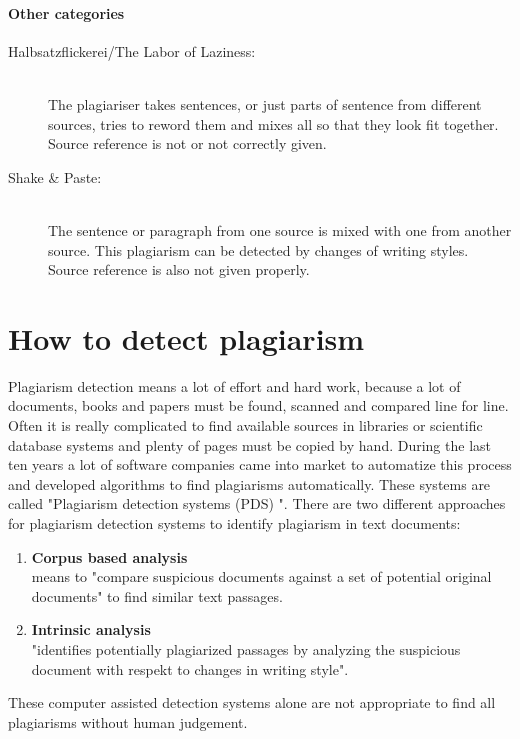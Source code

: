 \paragraph{Other categories}


\begin{description}
\item[Halbsatzflickerei/The Labor of Laziness:] \hfill \\
The plagiariser takes sentences, or just parts of sentence from different 
sources, tries to reword them and mixes all so that they look fit together. Source reference is not or not correctly 
given.

\item[Shake \& Paste:] \hfill \\
The sentence or paragraph from one source is mixed with one from another source. This 
plagiarism can be detected by changes of writing styles. Source reference is also not given properly.
\end{description}

\section{How to detect plagiarism}
Plagiarism detection means a lot of effort and hard work, because a lot of documents, books and papers must be found, scanned and compared line for line. Often it is really complicated to find available sources in libraries or scientific database systems and plenty of pages must be copied by hand. 
During the last ten years a lot of software companies came into market to automatize this process and developed algorithms to find plagiarisms automatically. These systems are called "Plagiarism detection systems (PDS) ". 
There are two different approaches for plagiarism detection systems to identify plagiarism in text documents:
\begin{enumerate}
\item \textbf{Corpus based analysis}\\
means to "compare suspicious documents against a set of potential original documents" \citet{PAN:2007} to find similar text passages.
\item \textbf{Intrinsic analysis}\\
"identifies potentially plagiarized passages by analyzing the suspicious document with respekt to changes in writing style". \citep{PAN:2007}
\end{enumerate}
These computer assisted detection systems alone are not appropriate to find all plagiarisms without human judgement.  

